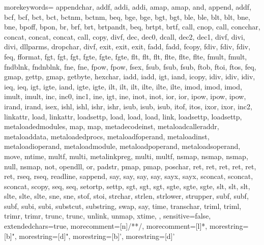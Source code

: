 {morekeywords={
appendchar,
addf,
addi,
addi,
amap,
amap,
and,
append,
addf,
bcf,
bcf,
bct,
bct,
bctnm,
bctnm,
beq,
bge,
bge,
bgt,
bgt,
ble,
ble,
blt,
blt,
bne,
bne,
bpoff,
bpon,
br,
brf,
brt,
brtpandt,
beq,
brtpt,
brtf,
call,
cnop,
call,
concchar,
concat,
concat,
concat,
call,
copy,
divf,
dec,
dec0,
dcall,
dec2,
dec1,
divf,
divi,
divi,
dllparms,
dropchar,
divf,
exit,
exit,
exit,
fadd,
fadd,
fcopy,
fdiv,
fdiv,
fdiv,
feq,
fformat,
fgt,
fgt,
fgt,
fgte,
fgte,
fgte,
flt,
flt,
flt,
flte,
flte,
flte,
fmult,
fmult,
fndblnk,
fndnblnk,
fne,
fne,
fpow,
fpow,
fsex,
fsub,
fsub,
fsub,
ftob,
ftoi,
ftos,
feq,
gmap,
gettp,
gmap,
getbyte,
hexchar,
iadd,
iadd,
igt,
iand,
icopy,
idiv,
idiv,
idiv,
ieq,
ieq,
igt,
igte,
iand,
igte,
igte,
ilt,
ilt,
ilt,
ilte,
ilte,
ilte,
imod,
imod,
imod,
imult,
imult,
inc,
inc0,
inc1,
ine,
igt,
ine,
inot,
inot,
ior,
ior,
ipow,
ipow,
ipow,
irand,
irand,
isex,
ishl,
ishl,
ishr,
ishr,
isub,
isub,
isub,
itof,
itos,
ixor,
ixor,
inc2,
linkattr,
load,
linkattr,
loadsettp,
load,
load,
load,
link,
loadsettp,
loadsettp,
metaloadedmodules,
map,
map,
metadecodeinst,
metaloadcalleraddr,
metaloaddata,
metaloadedprocs,
metaloadfoperand,
metaloadinst,
metaloadioperand,
metaloadmodule,
metaloadpoperand,
metaloadsoperand,
move,
mtime,
multf,
multi,
metalinkpreg,
multi,
multf,
nsmap,
nsmap,
nsmap,
null,
nsmap,
not,
opendll,
or,
padstr,
pmap,
pmap,
poschar,
ret,
ret,
ret,
ret,
ret,
ret,
rseq,
rseq,
readline,
sappend,
say,
say,
say,
say,
sayx,
sayx,
sconcat,
sconcat,
sconcat,
scopy,
seq,
seq,
setortp,
settp,
sgt,
sgt,
sgt,
sgte,
sgte,
sgte,
slt,
slt,
slt,
slte,
slte,
slte,
sne,
sne,
stof,
stoi,
strchar,
strlen,
strlower,
strupper,
subf,
subf,
subf,
subi,
subi,
substcut,
substring,
swap,
say,
time,
transchar,
triml,
triml,
trimr,
trimr,
trunc,
trunc,
unlink,
unmap,
xtime,
  },
sensitive=false,
extendedchars=true,
morecomment=[n]{/*}{*/},
morecomment=[l]{*},
morestring=[b]",
morestring=[d]",
morestring=[b]',
morestring=[d]'}

